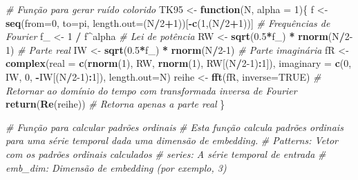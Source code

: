 \documentclass[
]{article}
\newenvironment{Shaded}{\begin{snugshade}}{\end{snugshade}}
\newcommand{\AttributeTok}[1]{\textcolor[rgb]{0.13,0.29,0.53}{#1}}
\newcommand{\CommentTok}[1]{\textcolor[rgb]{0.56,0.35,0.01}{\textit{#1}}}
\newcommand{\ConstantTok}[1]{\textcolor[rgb]{0.56,0.35,0.01}{#1}}
\newcommand{\ControlFlowTok}[1]{\textcolor[rgb]{0.13,0.29,0.53}{\textbf{#1}}}
\newcommand{\DecValTok}[1]{\textcolor[rgb]{0.00,0.00,0.81}{#1}}
\newcommand{\FloatTok}[1]{\textcolor[rgb]{0.00,0.00,0.81}{#1}}
\newcommand{\FunctionTok}[1]{\textcolor[rgb]{0.13,0.29,0.53}{\textbf{#1}}}
\newcommand{\NormalTok}[1]{#1}
\newcommand{\OtherTok}[1]{\textcolor[rgb]{0.56,0.35,0.01}{#1}}
\newcommand{\SpecialCharTok}[1]{\textcolor[rgb]{0.81,0.36,0.00}{\textbf{#1}}}
\begin{document}
\begin{Shaded}
\begin{Highlighting}[]
\CommentTok{\# Função para gerar ruído colorido}
\NormalTok{TK95 }\OtherTok{\textless{}{-}} \ControlFlowTok{function}\NormalTok{(N, }\AttributeTok{alpha =} \DecValTok{1}\NormalTok{)\{ }
\NormalTok{    f }\OtherTok{\textless{}{-}} \FunctionTok{seq}\NormalTok{(}\AttributeTok{from=}\DecValTok{0}\NormalTok{, }\AttributeTok{to=}\NormalTok{pi, }\AttributeTok{length.out=}\NormalTok{(N}\SpecialCharTok{/}\DecValTok{2}\SpecialCharTok{+}\DecValTok{1}\NormalTok{))[}\SpecialCharTok{{-}}\FunctionTok{c}\NormalTok{(}\DecValTok{1}\NormalTok{,(N}\SpecialCharTok{/}\DecValTok{2}\SpecialCharTok{+}\DecValTok{1}\NormalTok{))] }\CommentTok{\# Frequências de Fourier}
\NormalTok{    f\_ }\OtherTok{\textless{}{-}} \DecValTok{1} \SpecialCharTok{/}\NormalTok{ f}\SpecialCharTok{\^{}}\NormalTok{alpha }\CommentTok{\# Lei de potência}
\NormalTok{    RW }\OtherTok{\textless{}{-}} \FunctionTok{sqrt}\NormalTok{(}\FloatTok{0.5}\SpecialCharTok{*}\NormalTok{f\_) }\SpecialCharTok{*} \FunctionTok{rnorm}\NormalTok{(N}\SpecialCharTok{/}\DecValTok{2{-}1}\NormalTok{) }\CommentTok{\# Parte real}
\NormalTok{    IW }\OtherTok{\textless{}{-}} \FunctionTok{sqrt}\NormalTok{(}\FloatTok{0.5}\SpecialCharTok{*}\NormalTok{f\_) }\SpecialCharTok{*} \FunctionTok{rnorm}\NormalTok{(N}\SpecialCharTok{/}\DecValTok{2{-}1}\NormalTok{) }\CommentTok{\# Parte imaginária}
\NormalTok{    fR }\OtherTok{\textless{}{-}} \FunctionTok{complex}\NormalTok{(}\AttributeTok{real =} \FunctionTok{c}\NormalTok{(}\FunctionTok{rnorm}\NormalTok{(}\DecValTok{1}\NormalTok{), RW, }\FunctionTok{rnorm}\NormalTok{(}\DecValTok{1}\NormalTok{), RW[(N}\SpecialCharTok{/}\DecValTok{2{-}1}\NormalTok{)}\SpecialCharTok{:}\DecValTok{1}\NormalTok{]), }
                  \AttributeTok{imaginary =} \FunctionTok{c}\NormalTok{(}\DecValTok{0}\NormalTok{, IW, }\DecValTok{0}\NormalTok{, }\SpecialCharTok{{-}}\NormalTok{IW[(N}\SpecialCharTok{/}\DecValTok{2{-}1}\NormalTok{)}\SpecialCharTok{:}\DecValTok{1}\NormalTok{]), }\AttributeTok{length.out=}\NormalTok{N)}
\NormalTok{    reihe }\OtherTok{\textless{}{-}} \FunctionTok{fft}\NormalTok{(fR, }\AttributeTok{inverse=}\ConstantTok{TRUE}\NormalTok{) }\CommentTok{\# Retornar ao domínio do tempo com transformada inversa de Fourier}
    \FunctionTok{return}\NormalTok{(}\FunctionTok{Re}\NormalTok{(reihe)) }\CommentTok{\# Retorna apenas a parte real}
\NormalTok{\}}


\CommentTok{\# Função para calcular padrões ordinais}
\CommentTok{\# Esta função calcula padrões ordinais para uma série temporal dada uma dimensão de embedding.}
\CommentTok{\# Patterns: Vetor com os padrões ordinais calculados}
\CommentTok{\# series: A série temporal de entrada}
\CommentTok{\# emb\_dim: Dimensão de embedding (por exemplo, 3)}


\end{Highlighting}
\end{Shaded}
\end{document}

